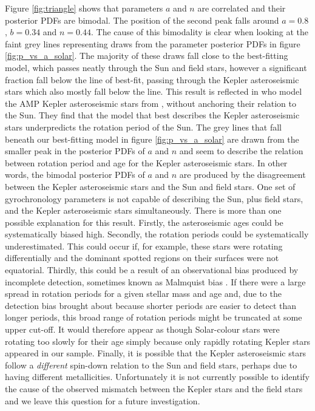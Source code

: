 \documentclass[useAMS, usenatbib]{mn2e}
\begin{document}
Figure \ref{fig:triangle} shows that parameters $a$ and $n$ are
correlated and their posterior PDFs are bimodal.
The position of the second peak falls around $a = 0.8$, $b = 0.34$ and
$n = 0.44$.
The cause of this bimodality is clear when looking at the faint grey lines
representing draws from the parameter posterior PDFs in
figure \ref{fig:p_vs_a_solar}.
The majority of these draws fall close to the best-fitting model, which passes
neatly through the Sun and field stars, however a significant fraction fall
below the line of best-fit, passing through the Kepler asteroseismic stars
which also mostly fall below the line.
This result is reflected in \citet{Garcia2014} who model the AMP
Kepler asteroseismic stars from \citet{Metcalfe2014}, without anchoring their
relation to the Sun.
They find that the model that best describes the Kepler asteroseismic stars
underpredicts the rotation period of the Sun.
The grey lines that fall beneath our best-fitting model in figure
\ref{fig:p_vs_a_solar} are drawn from the smaller peak in the posterior PDFs
of $a$ and $n$ and seem to describe the relation between rotation period and
age for the Kepler asteroseismic stars.
In other words, the bimodal posterior PDFs of $a$ and $n$ are produced by the
disagreement between the Kepler asteroseismic stars and the Sun and field
stars.
One set of gyrochronology parameters is not
capable of describing the Sun, plus field stars, and the Kepler
asteroseismic stars simultaneously.
There is more than one possible explanation for this result.
Firstly, the asteroseismic ages could be systematically biased high.
Secondly, the rotation periods could be systematically underestimated.
This could occur if, for example, these stars were rotating differentially
and the dominant spotted regions on their surfaces were not equatorial.
Thirdly, this could be a result of an observational bias produced by incomplete
detection, sometimes known as Malmquist bias \citep{Malmquist1920}.
If there were a large spread in rotation periods for a given stellar mass and
age and, due to the detection bias brought about because shorter periods are
easier to detect than longer periods, this broad range of rotation periods
might be truncated at some upper cut-off.
It would therefore appear as though Solar-colour stars were rotating too
slowly for their age simply because only rapidly rotating Kepler stars appeared
in our sample.
Finally, it is possible that the Kepler asteroseismic stars follow a
\emph{different} spin-down relation to the Sun and field stars, perhaps due to
having different metallicities. %
Unfortunately it is not currently possible to identify the cause of the
observed mismatch between the Kepler stars and the field stars and we leave
this question for a future investigation.
\end{document}
